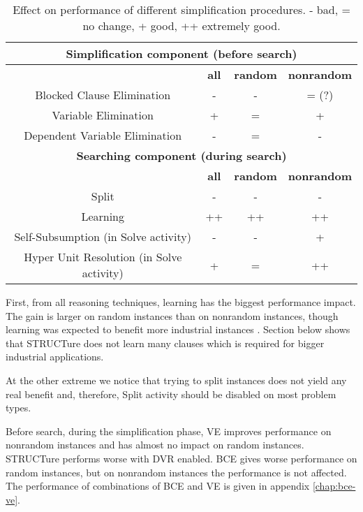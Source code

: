 \begin{table}
  \centering
  \begin{tabular}{| c | c | c | c |}
    \hline
    \multicolumn{4}{|c|}{\textbf{Simplification component (before search)}} \\
    \hline
    & \textbf{all} & \textbf{random} & \textbf{nonrandom} \\
    \hline
    Blocked Clause Elimination & - & - & = (?) \\
    Variable Elimination & + & = & + \\
    Dependent Variable Elimination & - & = & - \\
    \hline
    \hline
    \multicolumn{4}{|c|}{\textbf{Searching component (during search)}} \\
    \hline
    & \textbf{all} & \textbf{random} & \textbf{nonrandom} \\
    \hline
    Split & - & - & - \\
    Learning & ++ & ++ & ++ \\
    Self-Subsumption (in Solve activity) & - & - & + \\
    Hyper Unit Resolution (in Solve activity) & + & = & ++ \\
    \hline
  \end{tabular}

  \caption{Effect on performance of different simplification procedures.
  - bad, = no change, + good, ++ extremely good.}
  \label{tbl:disable}
\end{table}

First, from all reasoning techniques, learning has the biggest
performance impact. The gain is larger on random instances than on
nonrandom instances, though learning was expected to benefit more
industrial instances \cite{DBLP:series/faia/SilvaLM09}. Section
below shows that STRUCTure does not learn many clauses which is
required for bigger industrial applications.

At the other extreme we notice that trying to split instances does not
yield any real benefit and, therefore, Split activity should be disabled
on most problem types.

Before search, during the simplification phase, VE improves
performance on nonrandom instances and has almost no impact on random
instances. STRUCTure performs worse with DVR enabled. BCE gives
worse performance on random instances, but on nonrandom instances
the performance is not affected.  The performance of combinations
of BCE and VE is given in appendix \ref{chap:bce-ve}.

